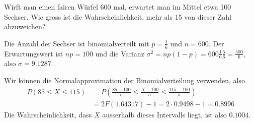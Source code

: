 Wirft man einen fairen Würfel 600 mal, erwartet man im Mittel
etwa 100 Sechser. Wie gross ist die Wahrscheinlichkeit,
mehr als 15 von dieser Zahl abzuweichen?


\begin{loesung}
Die Anzahl der Sechser ist binomialverteilt mit $p=\frac16$
und $n=600$. Der Erwartungswert ist $np=100$ und die
Varianz $\sigma^2=np(1-p)=600\frac16\frac56=\frac{500}6$,
also $\sigma=9.1287$.

Wir können die Normalapproximation der Binomialverteilung verwenden,
also
\begin{align*}
P(85\le X\le 115)
&=
P\left(\frac{85-100}{\sigma}\le\frac{X-100}{\sigma}\le\frac{115-100}{\sigma}\right)
\\
&=
2F(1.64317)-1=2\cdot 0.9498-1=0.8996
\end{align*}
Die Wahrscheinlichkeit, dass $X$ ausserhalb dieses Intervalls liegt,
ist also $0.1004$.
\end{loesung}
